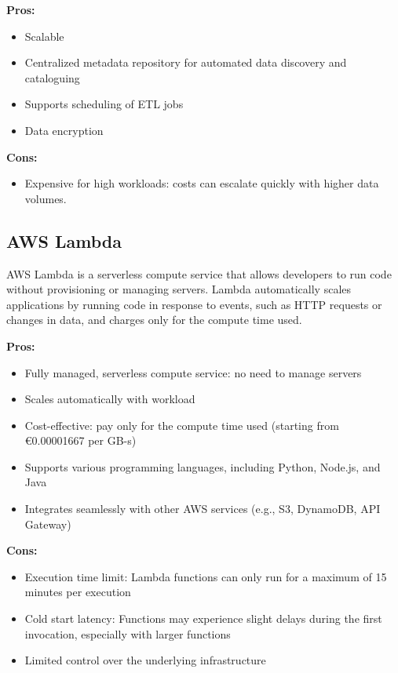 \textbf{Pros:}
\begin{itemize}
    \item Scalable
    \item Centralized metadata repository\cite{site:aws-glue-catalog} for automated data discovery and cataloguing
    \item Supports scheduling of ETL jobs
    \item Data encryption
\end{itemize}

\textbf{Cons:}
\begin{itemize}
    \item Expensive for high workloads: costs can escalate quickly with higher data volumes.
\end{itemize}

\subsection*{AWS Lambda}
\label{aws:lambda}
AWS Lambda is a serverless compute service that allows developers to run code without provisioning or managing servers. Lambda automatically scales applications by running code in response to events, such as HTTP requests or changes in data, and charges only for the compute time used.

\textbf{Pros:}
\begin{itemize}
    \item Fully managed, serverless compute service: no need to manage servers
    \item Scales automatically with workload
    \item Cost-effective: pay only for the compute time used (starting from €0.00001667 per GB-s)
    \item Supports various programming languages, including Python, Node.js, and Java
    \item Integrates seamlessly with other AWS services (e.g., S3, DynamoDB, API Gateway)
\end{itemize}

\textbf{Cons:}
\begin{itemize}
    \item Execution time limit: Lambda functions can only run for a maximum of 15 minutes per execution
    \item Cold start latency: Functions may experience slight delays during the first invocation, especially with larger functions
    \item Limited control over the underlying infrastructure
\end{itemize}

